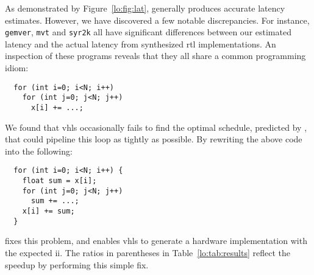 As demonstrated by Figure~\ref{lo:fig:lat}, \soap{} generally produces
accurate latency estimates.  However, we have discovered a few notable
discrepancies.  For instance, \verb|gemver|, \verb|mvt| and \verb|syr2k| all
have significant differences between our estimated latency and the actual
latency from synthesized \gls{rtl} implementations.  An inspection of these
programs reveals that they all share a common programming idiom:
%
\begin{lstlisting}
  for (int i=0; i<N; i++)
    for (int j=0; j<N; j++)
      x[i] += ...;
\end{lstlisting}
%
We found that \gls{vhls} occasionally fails to find the optimal schedule,
predicted by \soap, that could pipeline this loop as tightly as possible.  By
rewriting the above code into the following:
%
\begin{lstlisting}
  for (int i=0; i<N; i++) {
    float sum = x[i];
    for (int j=0; j<N; j++)
      sum += ...;
    x[i] += sum;
  }
\end{lstlisting}
%
fixes this problem, and enables \gls{vhls} to generate a hardware
implementation with the expected \gls{ii}. The ratios in parentheses in
Table~\ref{lo:tab:results} reflect the speedup by performing this simple fix.
